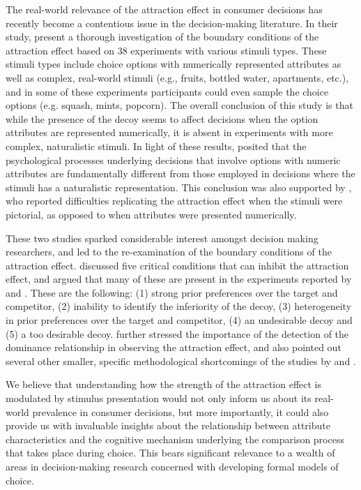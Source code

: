 \documentclass[12pt, a4paper]{article}
\begin{document}
The real-world relevance of the attraction effect in consumer decisions has recently become a contentious issue in the decision-making literature. In their study,  present a thorough investigation of the boundary conditions of the attraction effect based on 38 experiments with various stimuli types. These stimuli types include choice options with numerically represented attributes as well as complex, real-world stimuli (e.g., fruits, bottled water, apartments, etc.), and  in some of these experiments participants could even sample the choice options (e.g. squash, mints, popcorn). The overall conclusion of this study is that while the presence of the decoy seems to affect decisions when the option attributes are represented numerically, it is absent in experiments with more complex, naturalistic stimuli. In light of these results, \citeauthor{Frederick2014} posited that the psychological processes underlying decisions that involve options with numeric attributes are fundamentally different from those employed in decisions where the stimuli has a naturalistic representation. This conclusion was also supported by , who reported difficulties replicating the attraction effect when the stimuli were pictorial, as opposed to when attributes were presented numerically.

These two studies sparked considerable interest amongst decision making researchers, and led to the re-examination of the boundary conditions of the attraction effect.  discussed five critical conditions that can inhibit the attraction effect, and argued that many of these are present in the experiments reported by \citeauthor{Frederick2014} and \citeauthor{Yang2014}. These are the following: (1) strong prior preferences over the target and competitor, (2) inability to identify the inferiority of the decoy, (3) heterogeneity in prior preferences over the target and competitor, (4) an undesirable decoy and (5) a too desirable decoy.  further stressed the importance of the detection of the dominance relationship in observing the attraction effect, and also pointed out several other smaller, specific methodological shortcomings of the studies by \citeauthor{Frederick2014} and \citeauthor{Yang2014}.

We believe that understanding how the strength of the attraction effect is modulated by stimulus presentation would not only inform us about its real-world prevalence in consumer decisions, but more importantly, it could also provide us with invaluable insights about the relationship between attribute characteristics and the cognitive mechanism underlying the comparison process that takes place during choice. This bears significant relevance to a wealth of areas in decision-making research concerned with developing formal models of choice.
\end{document}
